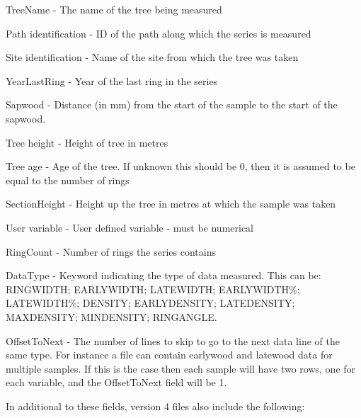 \begin{itemize*}
 \item TreeName - The name of the tree being measured
 \item Path identification - ID of the path along which the series is measured
 \item Site identification - Name of the site from which the tree was taken
 \item YearLastRing - Year of the last ring in the series
 \item Sapwood - Distance (in mm) from the start of the sample to the start of the sapwood.
 \item Tree height - Height of tree in metres
 \item Tree age - Age of the tree. If unknown this should be 0, then it is assumed to be equal to the number of rings
 \item SectionHeight - Height up the tree in metres at which the sample was taken
 \item User variable - User defined variable - must be numerical
 \item RingCount - Number of rings the series contains
 \item DataType - Keyword indicating the type of data measured. This can be: RINGWIDTH; EARLYWIDTH; LATEWIDTH; EARLYWIDTH\%; LATEWIDTH\%; DENSITY; EARLYDENSITY; LATEDENSITY; MAXDENSITY; MINDENSITY; RINGANGLE.
 \item OffsetToNext - The number of lines to skip to go to the next data line of the same type. For instance a file can contain earlywood and latewood data for multiple samples. If this is the case then each sample will have two rows, one for each variable, and the OffsetToNext field will be 1. 
\end{itemize*}

In additional to these fields, version 4 files also include the following: 

